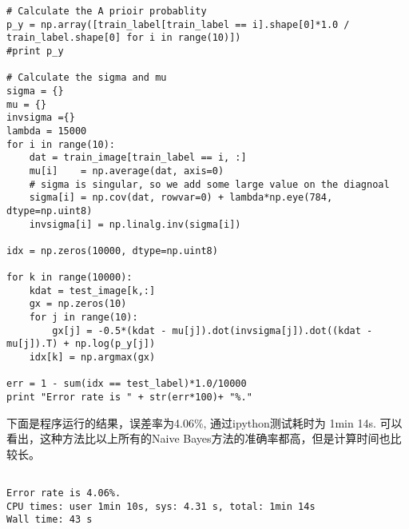 \documentclass[a4paper, 1pt]{article}
\begin{document}
\begin{spacing}{1.2}
\begin{lstlisting}
# Calculate the A prioir probablity
p_y = np.array([train_label[train_label == i].shape[0]*1.0 / train_label.shape[0] for i in range(10)])
#print p_y

# Calculate the sigma and mu
sigma = {}
mu = {}
invsigma ={}
lambda = 15000
for i in range(10):
    dat = train_image[train_label == i, :]
    mu[i]    = np.average(dat, axis=0)
    # sigma is singular, so we add some large value on the diagnoal
    sigma[i] = np.cov(dat, rowvar=0) + lambda*np.eye(784, dtype=np.uint8)
    invsigma[i] = np.linalg.inv(sigma[i])

idx = np.zeros(10000, dtype=np.uint8)

for k in range(10000):
    kdat = test_image[k,:]
    gx = np.zeros(10)
    for j in range(10):
        gx[j] = -0.5*(kdat - mu[j]).dot(invsigma[j]).dot((kdat - mu[j]).T) + np.log(p_y[j])
    idx[k] = np.argmax(gx)

err = 1 - sum(idx == test_label)*1.0/10000
print "Error rate is " + str(err*100)+ "%."
\end{lstlisting}

下面是程序运行的结果，误差率为4.06\%, 通过ipython测试耗时为 1min 14s. 可以看出，这种方法比以上所有的Naive Bayes方法的准确率都高，但是计算时间也比较长。

\begin{lstlisting}

Error rate is 4.06%.
CPU times: user 1min 10s, sys: 4.31 s, total: 1min 14s
Wall time: 43 s
\end{lstlisting}


\end{spacing}
\end{document}
